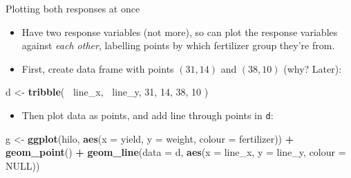 \documentclass[ignorenonframetext,]{beamer}
\newenvironment{Shaded}{\begin{snugshade}}{\end{snugshade}}
\newcommand{\DataTypeTok}[1]{\textcolor[rgb]{0.13,0.29,0.53}{#1}}
\newcommand{\DecValTok}[1]{\textcolor[rgb]{0.00,0.00,0.81}{#1}}
\newcommand{\KeywordTok}[1]{\textcolor[rgb]{0.13,0.29,0.53}{\textbf{#1}}}
\newcommand{\NormalTok}[1]{#1}
\newcommand{\OperatorTok}[1]{\textcolor[rgb]{0.81,0.36,0.00}{\textbf{#1}}}
\newcommand{\OtherTok}[1]{\textcolor[rgb]{0.56,0.35,0.01}{#1}}
\newcommand{\StringTok}[1]{\textcolor[rgb]{0.31,0.60,0.02}{#1}}
\providecommand{\tightlist}{%
  \setlength{\itemsep}{0pt}\setlength{\parskip}{0pt}}
\begin{document}
\begin{frame}[fragile]{Plotting both responses at once}
\protect\hypertarget{plotting-both-responses-at-once}{}

\begin{itemize}
\item
  Have two response variables (not more), so can plot the response
  variables against \emph{each other}, labelling points by which
  fertilizer group they're from.
\item
  First, create data frame with points \((31,14)\) and \((38,10)\) (why?
  Later):
\end{itemize}

\begin{Shaded}
\begin{Highlighting}[]
\NormalTok{d <-}\StringTok{ }\KeywordTok{tribble}\NormalTok{(}
  \OperatorTok{~}\NormalTok{line_x, }\OperatorTok{~}\NormalTok{line_y,}
  \DecValTok{31}\NormalTok{, }\DecValTok{14}\NormalTok{,}
  \DecValTok{38}\NormalTok{, }\DecValTok{10}
\NormalTok{)}
\end{Highlighting}
\end{Shaded}

\begin{itemize}
\tightlist
\item
  Then plot data as points, and add line through points in \texttt{d}:
\end{itemize}

\begin{Shaded}
\begin{Highlighting}[]
\NormalTok{g <-}\StringTok{ }\KeywordTok{ggplot}\NormalTok{(hilo, }\KeywordTok{aes}\NormalTok{(}\DataTypeTok{x =}\NormalTok{ yield, }\DataTypeTok{y =}\NormalTok{ weight,}
                      \DataTypeTok{colour =}\NormalTok{ fertilizer)) }\OperatorTok{+}\StringTok{ }\KeywordTok{geom_point}\NormalTok{() }\OperatorTok{+}
\StringTok{  }\KeywordTok{geom_line}\NormalTok{(}\DataTypeTok{data =}\NormalTok{ d,}
            \KeywordTok{aes}\NormalTok{(}\DataTypeTok{x =}\NormalTok{ line_x, }\DataTypeTok{y =}\NormalTok{ line_y, }\DataTypeTok{colour =} \OtherTok{NULL}\NormalTok{))}
\end{Highlighting}
\end{Shaded}

\end{frame}
\end{document}
